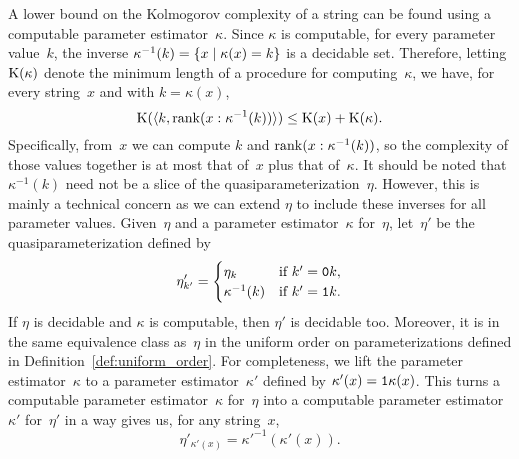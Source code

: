 A lower bound on the Kolmogorov complexity of a string can be found using a computable parameter estimator~$\kappa$.
Since $\kappa$ is computable, for every parameter value~$k$, the inverse $\kappa^{-1}(k) = \{x \;|\; \kappa(x) = k\}$ is a decidable set.
Therefore, letting $\operatorname{K}(\kappa)$ denote the minimum length of a procedure for computing~$\kappa$, we have, for every string~$x$ and with $k = \kappa(x)$,
\begin{equation}
\label{eq:kclowerbound}
  \operatorname{K}({\langle k, \operatorname{rank}(x : \kappa^{-1}(k))\rangle}) \le \operatorname{K}(x) + \operatorname{K}(\kappa).
\end{equation}
Specifically, from~$x$ we can compute $k$ and $\operatorname{rank}(x : \kappa^{-1}(k))$, so the complexity of those values together is at most that of~$x$ plus that of~$\kappa$.
It should be noted that $\kappa^{-1}(k)$ need not be a slice of the quasiparameterization~$\eta$.
However, this is mainly a technical concern as we can extend $\eta$ to include these inverses for all parameter values.
Given~$\eta$ and a parameter estimator~$\kappa$ for~$\eta$, let~$\eta'$ be the quasiparameterization defined by
\begin{equation*}
  \eta'_{k'} = \begin{cases}
    \eta_k	&\text{if $k' = \textnormal{\texttt{0}}k$}, \\
    \kappa^{-1}(k)	&\text{if $k' = \textnormal{\texttt{1}}k$}.
  \end{cases}
\end{equation*}
If $\eta$ is decidable and $\kappa$ is computable, then $\eta'$ is decidable too.
Moreover, it is in the same equivalence class as~$\eta$ in the uniform order on parameterizations defined in Definition~\ref{def:uniform_order}.
For completeness, we lift the parameter estimator~$\kappa$ to a parameter estimator~$\kappa'$ defined by $\kappa'(x) = \textnormal{\texttt{1}}\kappa(x)$.
This turns a computable parameter estimator~$\kappa$ for~$\eta$ into a computable parameter estimator~$\kappa'$ for~$\eta'$ in a way gives us, for any string~$x$,
\begin{equation*}
  \eta'_{\kappa'(x)} = \kappa'^{-1}(\kappa'(x)).
\end{equation*}

